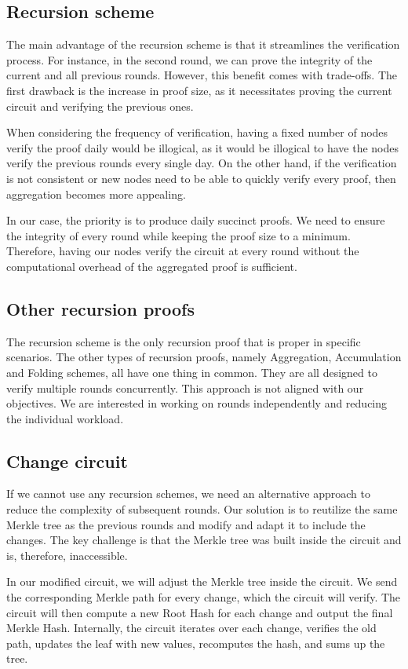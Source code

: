 \subsection{Recursion scheme}
The main advantage of the recursion scheme is that it streamlines the verification process. For instance, in the second round, we can prove the integrity of the current and all previous rounds.
However, this benefit comes with trade-offs. The first drawback is the increase in proof size, as it necessitates proving the current circuit and verifying the previous ones.

When considering the frequency of verification, having a fixed number of nodes verify the proof daily would be illogical, as it would be illogical to have the nodes verify the previous rounds every single day.
On the other hand, if the verification is not consistent or new nodes need to be able to quickly verify every proof, then aggregation becomes more appealing.

In our case, the priority is to produce daily succinct proofs. We need to ensure the integrity of every round while keeping the proof size to a minimum.
Therefore, having our nodes verify the circuit at every round without the computational overhead of the aggregated proof is sufficient.

\subsection{Other recursion proofs}
The recursion scheme is the only recursion proof that is proper in specific scenarios.
The other types of recursion proofs, namely Aggregation, Accumulation and Folding schemes, all have one thing in common.
They are all designed to verify multiple rounds concurrently.
This approach is not aligned with our objectives. We are interested in working on rounds independently and reducing the individual workload.

\subsection{Change circuit}
If we cannot use any recursion schemes, we need an alternative approach to reduce the complexity of subsequent rounds.
Our solution is to reutilize the same Merkle tree as the previous rounds and modify and adapt it to include the changes.
The key challenge is that the Merkle tree was built inside the circuit and is, therefore, inaccessible.

In our modified circuit, we will adjust the Merkle tree inside the circuit.
We send the corresponding Merkle path for every change, which the circuit will verify.
The circuit will then compute a new Root Hash for each change and output the final Merkle Hash. 
Internally, the circuit iterates over each change, verifies the old path, updates the leaf with new values, recomputes the hash, and sums up the tree.


